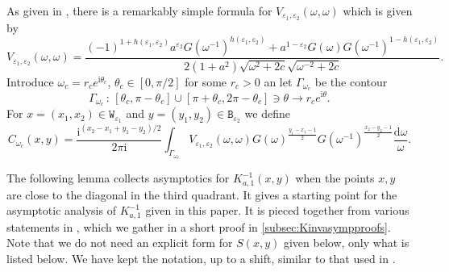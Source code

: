 \documentclass[11pt,twoside]{amsart}
\theoremstyle{plain}
\numberwithin{quest}{section}
\theoremstyle{remark}
\numberwithin{rem}{section}
\theoremstyle{definition}
\newcommand{\eps}{\varepsilon}
\begin{document}
	
	As given in \cite[Lemma 3.2]{CJ16}, there is a remarkably simple formula for $V_{\eps_1,\eps_2}(\omega, \omega)$ which is given by 
	\begin{equation}\label{eq:prev:Vww}
		V_{\eps_1,\eps_2}(\omega, \omega) =\frac{ (-1)^{1+h(\eps_1,\eps_2)} a^{\eps_2}  G\left( \omega^{-1} \right)^{h(\eps_1,\eps_2)} + a^{1-\eps_2} G\left( \omega \right)  G\left( \omega^{-1} \right)^{1-h(\eps_1,\eps_2)} }{2(1+a^2) \sqrt{\omega^2+2c} \sqrt{\omega^{-2}+2c} }.
	\end{equation}
	Introduce $\omega_c =r_c e^{\mathrm{i} \theta_c}$, $\theta_c \in [0,\pi/2]$ for some $r_c>0$ an let $\Gamma_{\omega_c}$ be the contour 
	\begin{equation*}\label{eq:prev:Gammawc}
		\Gamma_{\omega_c}\,:\,[\theta_c,\pi-\theta_c]\cup[\pi+\theta_c,2\pi-\theta_c]\ni\theta\to r_c e^{\mathrm{i}\theta}.
	\end{equation*}
	For $x=(x_1,x_2) \in \mathtt{W}_{\eps_1}$ and $y=(y_1,y_2) \in \mathtt{B}_{\eps_2}$ we
	define
	\begin{equation}\label{eq:prev:Comega}
		C_{\omega_c}(x,y)=\frac{\mathrm{i}^{(x_2-x_1+y_1-y_2)/2}}{2\pi\mathrm{i}}\int_{\Gamma_{\omega_c}}
		V_{\eps_1,\eps_2}(\omega,\omega) G(\omega)^{\frac{y_1-x_1-1}{2}}G(\omega^{-1})^{\frac{x_2-y_2-1}{2}}\frac{\mathrm{d}\omega}{\omega}.
	\end{equation}
	
	The following lemma collects asymptotics for $K^{-1}_{a,1}(x, y)$ when the points $x, y$ are close to the diagonal in the third quadrant. It gives a starting point for the asymptotic analysis of $K^{-1}_{a,1}$ given in this paper.  It is pieced together from various statements in \cite{CJ16}, which we gather in a short proof in \cref{subsec:Kinvasympproofs}.  Note that we do not need an explicit form for $S(x,y)$ given below, only what is listed below.  We have kept the notation, up to a shift, similar to that used in \cite{CJ16}. 
	
\end{document}
